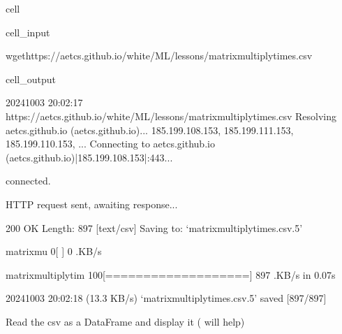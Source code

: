 \documentclass[letterpaper,10pt,english]{jupyterBook}
\begin{document}
\begin{sphinxuseclass}{cell}\begin{sphinxVerbatimInput}

\begin{sphinxuseclass}{cell_input}
\begin{sphinxVerbatim}[commandchars=\\\{\}]
wgethttps://aet\PYGZhy{}cs.github.io/white/ML/lessons/matrix\PYGZus{}multiply\PYGZus{}times.csv
\end{sphinxVerbatim}

\end{sphinxuseclass}\end{sphinxVerbatimInput}
\begin{sphinxVerbatimOutput}

\begin{sphinxuseclass}{cell_output}
\begin{sphinxVerbatim}[commandchars=\\\{\}]
\PYGZhy{}\PYGZhy{}2024\PYGZhy{}10\PYGZhy{}03 20:02:17\PYGZhy{}\PYGZhy{}  https://aet\PYGZhy{}cs.github.io/white/ML/lessons/matrix\PYGZus{}multiply\PYGZus{}times.csv
Resolving aet\PYGZhy{}cs.github.io (aet\PYGZhy{}cs.github.io)... 185.199.108.153, 185.199.111.153, 185.199.110.153, ...
Connecting to aet\PYGZhy{}cs.github.io (aet\PYGZhy{}cs.github.io)|185.199.108.153|:443... 
\end{sphinxVerbatim}

\begin{sphinxVerbatim}[commandchars=\\\{\}]
connected.
\end{sphinxVerbatim}

\begin{sphinxVerbatim}[commandchars=\\\{\}]
HTTP request sent, awaiting response... 
\end{sphinxVerbatim}

\begin{sphinxVerbatim}[commandchars=\\\{\}]
200 OK
Length: 897 [text/csv]
Saving to: ‘matrix\PYGZus{}multiply\PYGZus{}times.csv.5’


          matrix\PYGZus{}mu   0\PYGZpc{}[                    ]       0  \PYGZhy{}\PYGZhy{}.\PYGZhy{}KB/s               
\end{sphinxVerbatim}

\begin{sphinxVerbatim}[commandchars=\\\{\}]
matrix\PYGZus{}multiply\PYGZus{}tim 100\PYGZpc{}[===================\PYGZgt{}]     897  \PYGZhy{}\PYGZhy{}.\PYGZhy{}KB/s    in 0.07s   

2024\PYGZhy{}10\PYGZhy{}03 20:02:18 (13.3 KB/s) \PYGZhy{} ‘matrix\PYGZus{}multiply\PYGZus{}times.csv.5’ saved [897/897]
\end{sphinxVerbatim}

\end{sphinxuseclass}\end{sphinxVerbatimOutput}

\end{sphinxuseclass}
\sphinxAtStartPar
Read the csv as a DataFrame and display it ( will help)
\end{document}
